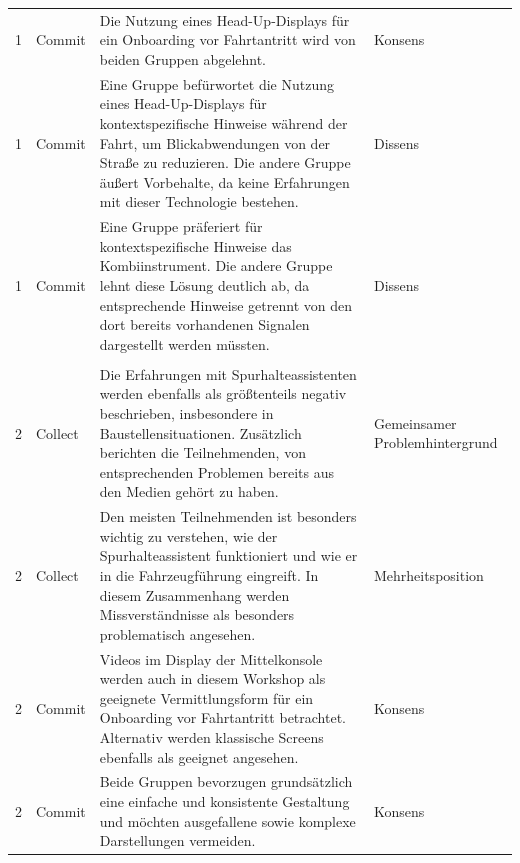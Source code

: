 {\begin{xltabular}{\textwidth}{
    P{1.25cm}
    P{1.35cm}
    Y
    P{2.3cm}
}
1 &
Commit &
Die Nutzung eines Head-Up-Displays für ein Onboarding vor Fahrtantritt wird von beiden Gruppen abgelehnt. &
Konsens
\\

\rowrule

1 &
Commit &
Eine Gruppe befürwortet die Nutzung eines Head-Up-Displays für kontextspezifische Hinweise während der Fahrt, um Blickabwendungen von der Straße zu reduzieren. Die andere Gruppe äußert Vorbehalte, da keine Erfahrungen mit dieser Technologie bestehen. &
Dissens
\\

\rowrule

1 &
Commit &
Eine Gruppe präferiert für kontextspezifische Hinweise das Kombiinstrument. Die andere Gruppe lehnt diese Lösung deutlich ab, da entsprechende Hinweise getrennt von den dort bereits vorhandenen Signalen dargestellt werden müssten. &
Dissens
\\

\rowrule
{}
\\

\rowrule

2 &
Collect &
Die Erfahrungen mit Spurhalteassistenten werden ebenfalls als größtenteils negativ beschrieben, insbesondere in Baustellensituationen. Zusätzlich berichten die Teilnehmenden, von entsprechenden Problemen bereits aus den Medien gehört zu haben. &
Gemeinsamer Problemhintergrund
\\

\rowrule

2 &
Collect &
Den meisten Teilnehmenden ist besonders wichtig zu verstehen, wie der Spurhalteassistent funktioniert und wie er in die Fahrzeugführung eingreift. In diesem Zusammenhang werden Missverständnisse als besonders problematisch angesehen. &
Mehrheitsposition
\\

\rowrule

2 &
Commit &
Videos im Display der Mittelkonsole werden auch in diesem Workshop als geeignete Vermittlungsform für ein Onboarding vor Fahrtantritt betrachtet. Alternativ werden klassische Screens ebenfalls als geeignet angesehen. &
Konsens
\\

\rowrule

2 &
Commit &
Beide Gruppen bevorzugen grundsätzlich eine einfache und konsistente Gestaltung und möchten ausgefallene sowie komplexe Darstellungen vermeiden. &
Konsens
\\


\end{xltabular}}
